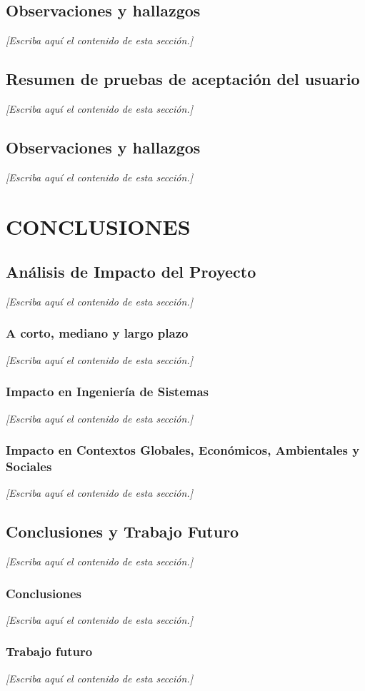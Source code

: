 \documentclass[12pt,letterpaper,oneside]{article}
\newcommand{\pendiente}[1][Escriba aquí el contenido de esta sección.]{%
  {\color{gray!75}\itshape [#1]}\par}
\newcommand{\capitulo}[1]{\clearpage\section{#1}}
\begin{document}
\subsection{Observaciones y hallazgos}
\pendiente

\subsection{Resumen de pruebas de aceptación del usuario}
\pendiente

\subsection{Observaciones y hallazgos}
\pendiente

\capitulo{CONCLUSIONES}

\subsection{Análisis de Impacto del Proyecto}
\pendiente

\subsubsection{A corto, mediano y largo plazo}
\pendiente

\subsubsection{Impacto en Ingeniería de Sistemas}
\pendiente

\subsubsection{Impacto en Contextos Globales, Económicos, Ambientales y Sociales}
\pendiente

\subsection{Conclusiones y Trabajo Futuro}
\pendiente

\subsubsection{Conclusiones}
\pendiente

\subsubsection{Trabajo futuro}
\pendiente
\end{document}

